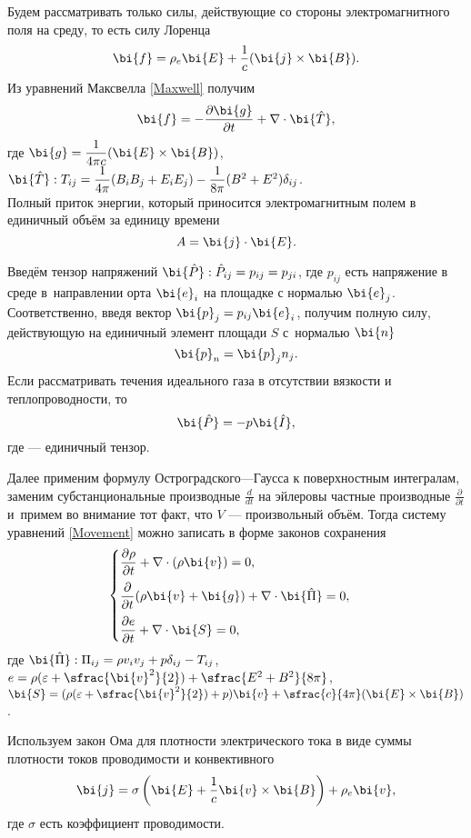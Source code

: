 \documentclass[12pt, a4paper]{article}
\begin{document}
	Будем рассматривать только силы, действующие со стороны электромагнитного поля на среду, то есть силу Лоренца
	\[
	\bi{f} = \rho_e\bi{E} + \dfrac{1}{c}(\bi{j} \times \bi{B}).
	\]
	Из уравнений Максвелла \eqref{Maxwell} получим
	\[
		\bi{f} = - \dfrac{\partial \bi{g}}{\partial t} + \nabla \cdot \bi{\hat{T}},
	\]
	где $\bi{g} = \dfrac{1}{4\pi c}(\bi{E}\times\bi{B})$, $\bi{\hat{T}}: T_{ij} = \dfrac{1}{4\pi}(B_iB_j + E_iE_j)-\dfrac{1}{8\pi}(B^2 + E^2)\delta_{ij}$. \\[-0.5mm]
	
	Полный приток энергии, который приносится электромагнитным полем в единичный объём за единицу времени
	\[
	A = \bi{j} \cdot \bi{E}.
	\]
	
	Введём тензор напряжений $\bi{\hat{P}}: \hat{P}_{ij} = p_{ij} = p_{ji}$, где $p_{ij}$ есть напряжение в среде в~направлении орта $\bi{e}_i$ на площадке с нормалью $\bi{e}_j$. Соответственно, введя вектор $\bi{p}_j = p_{ij}\bi{e}_{i}$, получим полную силу, действующую на единичный элемент площади $S$ с~нормалью $\bi{n}$
	\[
	\bi{p}_n = \bi{p}_j n_j.
	\]
	Если рассматривать течения идеального газа в отсутствии вязкости и теплопроводности, то
	\[
		\bi{\hat{P}} = -p \bi{\hat{I}},
	\] 
	где  --- единичный тензор.
	
	Далее применим формулу Остроградского---Гаусса к поверхностным интегралам, заменим субстанциональные производные $\frac{d}{dt}$ на эйлеровы частные производные $\frac{\partial}{\partial t}$ и~примем во внимание тот факт, что $V$ --- произвольный объём. Тогда систему уравнений \eqref{Movement} можно записать в форме законов сохранения
		\begin{equation}
		\label{Movement2}
		\begin{cases}
		\dfrac{\partial\rho}{\partial t} + \nabla \cdot (\rho \bi{v})   = 0, \\[3mm]
		\dfrac{\partial}{\partial t}(\rho \bi{v} + \bi{g}) + \nabla\cdot\bi{\hat{\Pi}} = 0, \\[3mm]
		\dfrac{\partial e}{\partial t} + \nabla\cdot\bi{S} = 0,
		\end{cases}
	\end{equation}
	где $\bi{\hat{\Pi}}: \Pi_{ij} = \rho v_i v_j + p\delta_{ij} - T_{ij}$, $e = \rho(\varepsilon + \sfrac{\bi{v}^2}{2})+\sfrac{E^2+B^2}{8\pi}$, $\bi{S} = (\rho(\varepsilon + \sfrac{\bi{v}^2}{2})+ p)\bi{v} + \sfrac{c}{4\pi}(\bi{E}\times\bi{B})$.
	
	Используем закон Ома для плотности электрического тока в виде суммы плотности токов проводимости и конвективного
	\[
	\bi{j} = \sigma \left(\bi{E}+ \dfrac1c \bi{v}\times \bi{B}\right) + \rho_e\bi{v},
	\]
	где $\sigma$ есть коэффициент проводимости.
	
\end{document}
